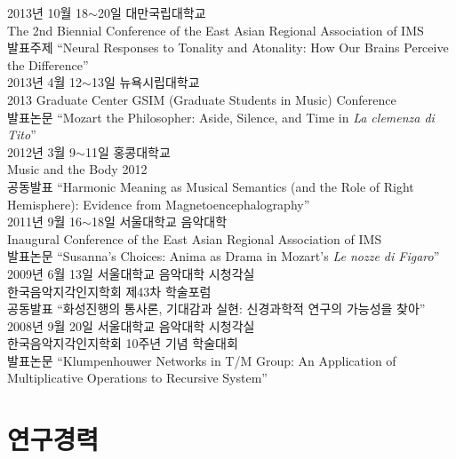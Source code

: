 \documentclass[dvipdfmx,a4paper]{article}
\begin{document}
  \noindent 2013년 10월 18$\sim$20일 대만국립대학교\\
  The 2nd Biennial Conference of the East Asian Regional Association of IMS\\
  발표주제 “Neural Responses to Tonality and Atonality: How Our Brains Perceive the Difference”\\
  
  \noindent 2013년 4월 12$\sim$13일 뉴욕시립대학교\\
  2013 Graduate Center GSIM (Graduate Students in Music) Conference\\
  발표논문 “Mozart the Philosopher: Aside, Silence, and Time in \textit{La clemenza di Tito}”\\
  
  \noindent 2012년 3월 9$\sim$11일 홍콩대학교\\
  Music and the Body 2012\\
  공동발표 “Harmonic Meaning as Musical Semantics (and the Role of Right Hemisphere): Evidence from Magnetoencephalography”\\
  
  \noindent 2011년 9월 16$\sim$18일 서울대학교 음악대학\\
  Inaugural Conference of the East Asian Regional Association of IMS\\
  발표논문 “Susanna’s Choices: Anima as Drama in Mozart’s \textit{Le nozze di Figaro}”\\
  
  
  \noindent 2009년 6월 13일 서울대학교 음악대학 시청각실\\
  한국음악지각인지학회 제43차 학술포럼\\
  공동발표 “화성진행의 통사론, 기대감과 실현: 신경과학적 연구의 가능성을 찾아”\\
  
  \noindent 2008년 9월 20일 서울대학교 음악대학 시청각실\\
  한국음악지각인지학회 10주년 기념 학술대회\\
  발표논문 “Klumpenhouwer Networks in T/M Group: An Application of Multiplicative Operations to Recursive System”\\
  
  \section*{\normalsize 연구경력}
  
\end{document}
